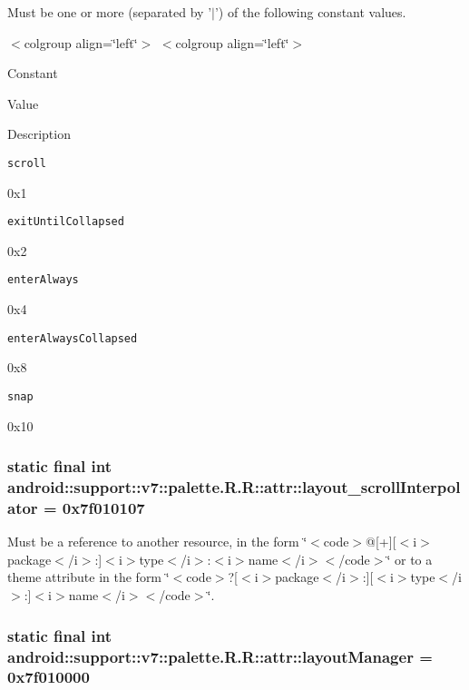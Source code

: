 Must be one or more (separated by '$|$') of the following constant values. \begin{TabularC}{0}
\hline
\end{TabularC}
$<$colgroup align=\char`\"{}left\char`\"{}$>$ $<$colgroup align=\char`\"{}left\char`\"{}$>$ 

Constant

Value

Description 

{\tt scroll}

0x1

{\tt exitUntilCollapsed}

0x2

{\tt enterAlways}

0x4

{\tt enterAlwaysCollapsed}

0x8

{\tt snap}

0x10\hypertarget{classandroid_1_1support_1_1v7_1_1palette_1_1_r_1_1attr_7eba625ad35d3465fb62732bf306094b}{
\subsubsection[{layout\_\-scrollInterpolator}]{\setlength{\rightskip}{0pt plus 5cm}static final int android::support::v7::palette.R.R::attr::layout\_\-scrollInterpolator = 0x7f010107}}
\label{classandroid_1_1support_1_1v7_1_1palette_1_1_r_1_1attr_7eba625ad35d3465fb62732bf306094b}


Must be a reference to another resource, in the form \char`\"{}$<$code$>$@\mbox{[}+\mbox{]}\mbox{[}$<$i$>$package$<$/i$>$:\mbox{]}$<$i$>$type$<$/i$>$:$<$i$>$name$<$/i$>$$<$/code$>$\char`\"{} or to a theme attribute in the form \char`\"{}$<$code$>$?\mbox{[}$<$i$>$package$<$/i$>$:\mbox{]}\mbox{[}$<$i$>$type$<$/i$>$:\mbox{]}$<$i$>$name$<$/i$>$$<$/code$>$\char`\"{}. \hypertarget{classandroid_1_1support_1_1v7_1_1palette_1_1_r_1_1attr_3b5f445769ce971a9d7de38b922998fb}{
\subsubsection[{layoutManager}]{\setlength{\rightskip}{0pt plus 5cm}static final int android::support::v7::palette.R.R::attr::layoutManager = 0x7f010000}}
\label{classandroid_1_1support_1_1v7_1_1palette_1_1_r_1_1attr_3b5f445769ce971a9d7de38b922998fb}


